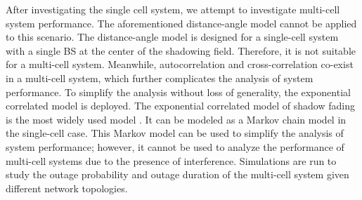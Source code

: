 \par After investigating the single cell system, we attempt to investigate multi-cell system performance. The aforementioned distance-angle model cannot be applied to this scenario. The distance-angle model is designed for a single-cell system with a single BS at the center of the shadowing field. Therefore, it is not suitable for a multi-cell system. Meanwhile, autocorrelation and cross-correlation co-exist in a multi-cell system, which further complicates the analysis of system performance. To simplify the analysis without loss of generality, the exponential correlated model is deployed. The exponential correlated model of shadow fading is the most widely used model  \cite{gudmundson1991correlation}. It can be modeled as a Markov chain model in the single-cell case. This Markov model can be used to simplify the analysis of system performance; however, it cannot be used to analyze the performance of multi-cell systems due to the presence of interference. Simulations are run to study the outage probability and outage duration of the multi-cell system given different network topologies. 


